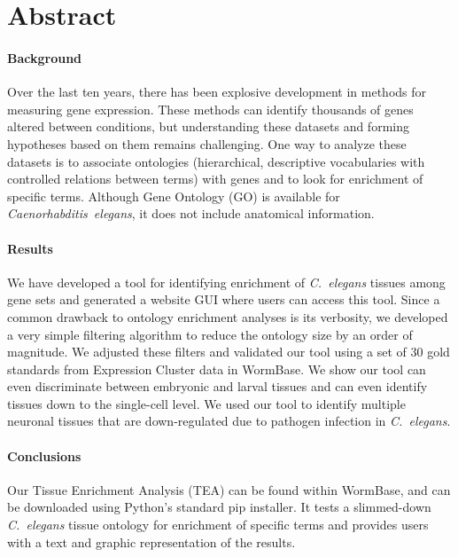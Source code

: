 
\section*{Abstract} %
\paragraph{Background}
Over the last ten years, there has been explosive development in methods
for measuring gene expression. These methods can identify thousands of
genes altered between conditions, but understanding these datasets and forming
hypotheses based on them remains challenging. One way to analyze these datasets
is to associate ontologies (hierarchical, descriptive vocabularies
with controlled relations between terms) with genes and to look for enrichment
of specific terms. Although Gene Ontology (GO) is available for
\emph{Caenorhabditis~elegans}, it does not include anatomical information.
\paragraph{Results}
We have developed a tool for identifying  enrichment of \emph{C.~elegans} tissues
among gene sets and generated a website GUI where users can access this tool.
Since a common drawback to ontology enrichment analyses is its verbosity, we
developed a very simple filtering algorithm to reduce the ontology size by an
order of magnitude. We adjusted these filters and validated our tool using a set
of 30  gold standards from Expression Cluster data in WormBase. We show our tool
can even discriminate between embryonic and larval tissues and can even identify
tissues down to the single-cell level. We used our tool to identify multiple
neuronal tissues that are down-regulated due to pathogen infection in
\emph{C.~elegans}.
\paragraph{Conclusions}
Our Tissue Enrichment Analysis (TEA) can be found within WormBase, and can be
downloaded using Python's standard pip installer. It tests a slimmed-down
\emph{C.~elegans} tissue ontology for enrichment of specific terms and provides
users with a  text and graphic representation of the results.

